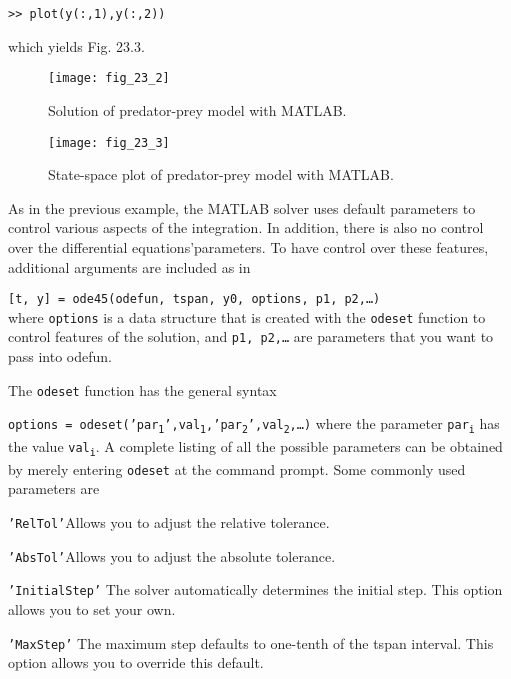 \documentclass[../main.tex]{subfiles}
\begin{document}
\begin{example}
\texttt{>> plot(y(:,1),y(:,2))}

\noindent which yields Fig. 23.3.

\begin{figure}[H]
    \centering
    \texttt{[image: fig\_23\_2]}
   \caption{\textsf{Solution of predator-prey model with MATLAB.}}\label{fig:fig_23_2}
\end{figure}

\begin{figure}[H]
    \centering
    \texttt{[image: fig\_23\_3]}
   \caption{\textsf{State-space plot of predator-prey model with MATLAB.\
   }}\label{fig:fig_23_3}
\end{figure}
\end{example}

As in the previous example, the MATLAB solver uses default parameters to control various aspects of the integration. In addition, there is also no control over the differential equations'parameters. To have control over these features, additional arguments are included as in

\texttt{[t, y] = ode45(odefun, tspan, y0, options, p1, p2,\ldots)}\\
where  \texttt{options} is a data structure that is created with the \texttt{odeset} function to control features of the solution, and \texttt{p1, p2,\ldots} are parameters that you want to pass into odefun.

The \texttt{odeset} function has the general syntax

\texttt{options = odeset('par\textsubscript{1}',val\textsubscript{1},'par\textsubscript{2}',val\textsubscript{2},\ldots)}
where the parameter \texttt{par\textsubscript{i}} has the value \texttt{val\textsubscript{i}}. A complete listing of all the possible parameters can be obtained by merely entering \texttt{odeset} at the command prompt. Some commonly used parameters are

\texttt{'RelTol'}\indent Allows you to adjust the relative tolerance.

\texttt{'AbsTol'}\indent Allows you to adjust the absolute tolerance.

\texttt{'InitialStep'}\hspace{1mm} The solver automatically determines the initial step. This option allows you to set your own. 

\texttt{'MaxStep'}\hspace{9mm} The maximum step defaults to one-tenth of the tspan interval. This option allows you to override this default.
\end{document}
